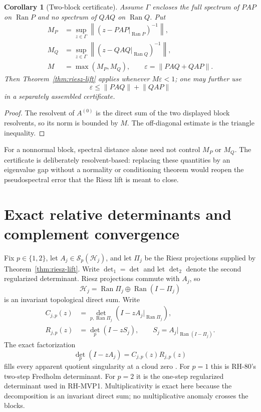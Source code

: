 \documentclass[11pt]{article}
\newtheorem{corollary}[theorem]{Corollary}
\theoremstyle{definition}
\theoremstyle{remark}
\newcommand{\cH}{\mathcal H}
\newcommand{\Ran}{\operatorname{Ran}}
\newcommand{\norm}[1]{\left\lVert#1\right\rVert}
\begin{document}
\begin{corollary}[Two-block certificate]\label{cor:two-block}
Assume $\Gamma$ encloses the full spectrum of $PAP$ on $\Ran P$ and no
spectrum of $QAQ$ on $\Ran Q$.  Put
\begin{align*}
 M_P&=\sup_{z\in\Gamma}
 \norm{(z-PAP|_{\Ran P})^{-1}},\\
 M_Q&=\sup_{z\in\Gamma}
 \norm{(z-QAQ|_{\Ran Q})^{-1}},\\
 M&=\max(M_P,M_Q),\qquad
 \varepsilon=\norm{PAQ+QAP}.
\end{align*}
Then Theorem~\ref{thm:riesz-lift} applies whenever $M\varepsilon<1$;
one may further use
\[
 \varepsilon\leq\norm{PAQ}+\norm{QAP}
\]
in a separately assembled certificate.
\end{corollary}
\begin{proof}
The resolvent of $A^{(0)}$ is the direct sum of the two displayed block
resolvents, so its norm is bounded by $M$.  The off-diagonal estimate is the
triangle inequality.
\end{proof}

For a nonnormal block, spectral distance alone need not control $M_P$ or
$M_Q$.  The certificate is deliberately resolvent-based: replacing these
quantities by an eigenvalue gap without a normality or conditioning theorem
would reopen the pseudospectral error that the Riesz lift is meant to close.

\section{Exact relative determinants and complement convergence}

Fix $p\in\{1,2\}$, let $A_j\in\mathcal S_p(\cH_j)$, and let $\Pi_j$ be the
Riesz projections supplied by Theorem~\ref{thm:riesz-lift}.  Write
$\det_1=\det$ and let $\det_2$ denote the second regularized determinant.
Riesz projections commute with $A_j$, so
\[
 \cH_j=\Ran\Pi_j\oplus\Ran(I-\Pi_j)
\]
is an invariant topological direct sum.  Write
\begin{align*}
 C_{j,p}(z)&=\det_{p,\Ran\Pi_j}(I-zA_j|_{\Ran\Pi_j}),\\
 R_{j,p}(z)&=\det_p(I-zS_j),
 \qquad S_j=A_j|_{\Ran(I-\Pi_j)}.
\end{align*}
The exact factorization
\begin{equation}\label{eq:factorization}
 \det_p(I-zA_j)=C_{j,p}(z)R_{j,p}(z)
\end{equation}
fills every apparent quotient singularity at a cloud zero \citep{Simon2005}.
For $p=1$ this is RH-80's two-step Fredholm determinant.  For $p=2$ it is
the one-step regularized determinant used in RH-MVP1.  Multiplicativity is
exact here because the decomposition is an invariant direct sum; no
multiplicative anomaly crosses the blocks.
\end{document}
